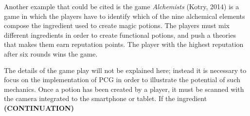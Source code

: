 Another example that could be cited is the game \textit{Alchemists} (Kotry, 2014)\cite{game:alch} is a game in which the players have to identify which of the nine alchemical elements compose the ingredient used to create magic potions. The players must mix different ingredients in order to create functional potions, and push a theories that makes them earn reputation points. The player with the highest reputation after six rounds wins the game.

The details of the game play will not be explained here; instead it is necessary to focus on the implementation of PCG in order to illustrate the potential of such mechanics. Once a potion has been created by a player, it must be scanned with the camera integrated to the smartphone or tablet. If the ingredient \textbf{(CONTINUATION)}\\



